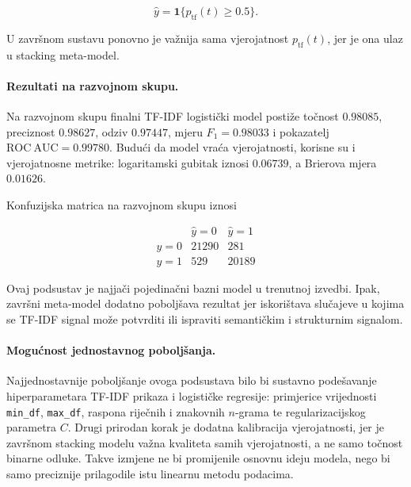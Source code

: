 \[
\hat y = \mathbf{1}\{p_{\mathrm{tf}}(t)\ge 0.5\}.
\]

U završnom sustavu ponovno je važnija sama vjerojatnost $p_{\mathrm{tf}}(t)$, jer je ona ulaz u stacking meta-model.

\paragraph{Rezultati na razvojnom skupu.}
Na razvojnom skupu finalni TF-IDF logistički model postiže točnost $0.98085$, preciznost $0.98627$, odziv $0.97447$, mjeru $F_1=0.98033$ i pokazatelj $\mathrm{ROC\ AUC}=0.99780$. Budući da model vraća vjerojatnosti, korisne su i vjerojatnosne metrike: logaritamski gubitak iznosi $0.06739$, a Brierova mjera $0.01626$.

Konfuzijska matrica na razvojnom skupu iznosi

\[
\begin{array}{c|cc}
 & \hat y=0 & \hat y=1 \\
\hline
y=0 & 21290 & 281 \\
y=1 & 529 & 20189
\end{array}
\]

Ovaj podsustav je najjači pojedinačni bazni model u trenutnoj izvedbi. Ipak, završni meta-model dodatno poboljšava rezultat jer iskorištava slučajeve u kojima se TF-IDF signal može potvrditi ili ispraviti semantičkim i strukturnim signalom.

\paragraph{Mogućnost jednostavnog poboljšanja.}
Najjednostavnije poboljšanje ovoga podsustava bilo bi sustavno podešavanje hiperparametara TF-IDF prikaza i logističke regresije: primjerice vrijednosti \texttt{min\_df}, \texttt{max\_df}, raspona riječnih i znakovnih $n$-grama te regularizacijskog parametra $C$. Drugi prirodan korak je dodatna kalibracija vjerojatnosti, jer je završnom stacking modelu važna kvaliteta samih vjerojatnosti, a ne samo točnost binarne odluke. Takve izmjene ne bi promijenile osnovnu ideju modela, nego bi samo preciznije prilagodile istu linearnu metodu podacima.